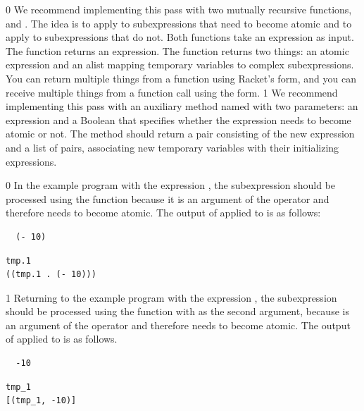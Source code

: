 \documentclass[7x10]{TimesAPriori_MIT}%
\def\racketEd{0}
\def\pythonEd{1}
\providecommand{\BookEdition}{1}
\let\edition\BookEdition
\newcommand{\pythonColor}[0]{}
\numberwithin{theorem}{chapter}
\numberwithin{definition}{chapter}
\numberwithin{equation}{chapter}
\begin{document}
{\if\edition\racketEd
We recommend implementing this pass with two mutually recursive
functions,  and . The idea is to apply
 to subexpressions that need to become atomic and to
apply  to subexpressions that do not.  Both functions
take an \LangVar{} expression as input.  The  function
returns an expression.  The  function returns two
things: an atomic expression and an alist mapping temporary variables to
complex subexpressions. You can return multiple things from a function
using Racket's  form, and you can receive multiple things
from a function call using the  form.
\fi}
%
{\if\edition\pythonEd\pythonColor
%
We recommend implementing this pass with an auxiliary method named
 with two parameters: an \LangVar{} expression and a
Boolean that specifies whether the expression needs to become atomic
or not.  The  method should return a pair consisting of
the new expression and a list of pairs, associating new temporary
variables with their initializing expressions.
%
\fi}

{\if\edition\racketEd
%
In the example program with the expression , the subexpression  should be processed using the
 function because it is an argument of the \code{+}
operator and therefore needs to become atomic.  The output of
 applied to  is as follows:
\begin{transformation}
\begin{lstlisting}
  (- 10)
\end{lstlisting}
\compilesto
\begin{lstlisting}
tmp.1
((tmp.1 . (- 10)))
\end{lstlisting}
\end{transformation}
\fi}
%
{\if\edition\pythonEd\pythonColor
%
Returning to the example program with the expression ,
the subexpression  should be processed using the
 function with  as the second argument,
because  is an argument of the \code{+} operator and
therefore needs to become atomic.  The output of 
applied to  is as follows.
\begin{transformation}
\begin{lstlisting}
  -10
\end{lstlisting}
\compilesto
\begin{lstlisting}
tmp_1
[(tmp_1, -10)]
\end{lstlisting}
\end{transformation}
%  
\fi}
\end{document}
